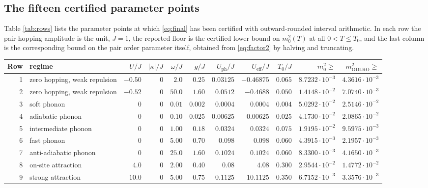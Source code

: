 \documentclass[11pt]{article}
\numberwithin{equation}{section}
\newcommand{\eff}{\mathrm{eff}}
\newcommand{\ODLRO}{\mathrm{ODLRO}}
\theoremstyle{definition}
\begin{document}
\subsection{The fifteen certified parameter points}

Table \ref{tab:rows} lists the parameter points at which \eqref{eq:final} has been certified with
outward-rounded interval arithmetic. In each row the pair-hopping amplitude is the unit,
$J=1$, the reported floor is the certified lower bound on $m_{0}^{2}(T)$ at all
$0<T\le T_0$, and the last column is the corresponding bound on the pair order
parameter itself, obtained from \eqref{eq:factor2} by halving and truncating.

\begin{table}[htbp]
\centering
\footnotesize
\setlength{\tabcolsep}{2.4pt}
\begin{tabular}{@{}rlrrrrrrrrr@{}}
\toprule
Row & regime & $U/J$ & $|\kappa|/J$ & $\omega/J$ & $g/J$ & $U_{\mathrm{ph}}/J$ & $U_{\eff}/J$ & $T_0/J$ & $m_{0}^{2}\ge$ & $m^{2}_{\ODLRO}\ge$\\
\midrule
1 & zero hopping, weak repulsion & $-0.50$ & $0$ & $2.0$ & $0.25$ & $0.03125$ & $-0.46875$ & $0.065$ & $8.7232\cdot10^{-3}$ & $4.3616\cdot10^{-3}$\\
2 & zero hopping, weak repulsion & $-0.52$ & $0$ & $50.0$ & $1.60$ & $0.0512$ & $-0.4688$ & $0.050$ & $1.4148\cdot10^{-2}$ & $7.0740\cdot10^{-3}$\\
3 & soft phonon & $0$ & $0$ & $0.01$ & $0.002$ & $0.0004$ & $0.0004$ & $0.004$ & $5.0292\cdot10^{-2}$ & $2.5146\cdot10^{-2}$\\
4 & adiabatic phonon & $0$ & $0$ & $0.10$ & $0.025$ & $0.00625$ & $0.00625$ & $0.025$ & $4.1730\cdot10^{-2}$ & $2.0865\cdot10^{-2}$\\
5 & intermediate phonon & $0$ & $0$ & $1.00$ & $0.18$ & $0.0324$ & $0.0324$ & $0.075$ & $1.9195\cdot10^{-2}$ & $9.5975\cdot10^{-3}$\\
6 & fast phonon & $0$ & $0$ & $5.00$ & $0.70$ & $0.098$ & $0.098$ & $0.060$ & $4.3915\cdot10^{-3}$ & $2.1957\cdot10^{-3}$\\
7 & anti-adiabatic phonon & $0$ & $0$ & $25.0$ & $1.60$ & $0.1024$ & $0.1024$ & $0.060$ & $8.3300\cdot10^{-3}$ & $4.1650\cdot10^{-3}$\\
8 & on-site attraction & $4.0$ & $0$ & $2.00$ & $0.40$ & $0.08$ & $4.08$ & $0.300$ & $2.9544\cdot10^{-2}$ & $1.4772\cdot10^{-2}$\\
9 & strong attraction & $10.0$ & $0$ & $5.00$ & $0.75$ & $0.1125$ & $10.1125$ & $0.350$ & $6.7152\cdot10^{-3}$ & $3.3576\cdot10^{-3}$\\

\end{tabular}
\end{table}
\end{document}
